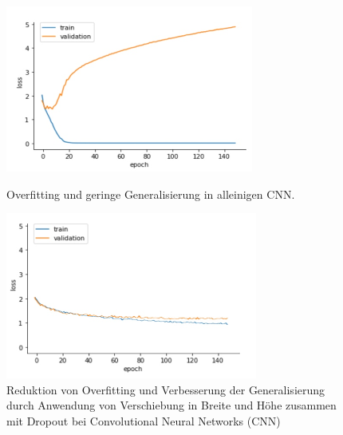     \begin{figure}[h]
        \centering
        \begin{minipage}[t]{0.45\textwidth}
            \centering
            \includegraphics[width=\textwidth]{img/overfitting.png}
            \caption{Overfitting und geringe Generalisierung in alleinigen CNN.}
        \end{minipage}\hfill
        \begin{minipage}[t]{0.45\textwidth}
            \centering
            \includegraphics[width=\textwidth]{img/overfitting_mit_data_agumentation_und_shifting_plus_dropout.png}
            \caption{Reduktion von Overfitting und Verbesserung der Generalisierung durch Anwendung von Verschiebung in Breite und Höhe zusammen mit Dropout bei Convolutional Neural Networks (CNN)}
        \end{minipage}
    \end{figure}
    
